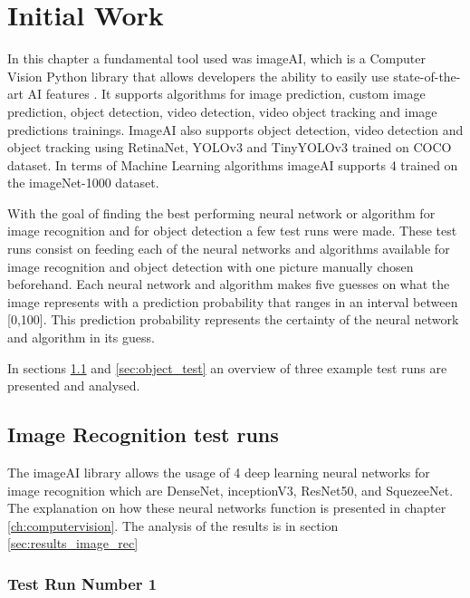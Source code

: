 \cleardoublepage

\chapter{Initial Work}

\par In this chapter a fundamental tool used was imageAI, which is a Computer Vision Python library that allows developers the ability to easily use state-of-the-art AI features . It supports algorithms for image prediction, custom image prediction, object detection, video detection, video object tracking and image predictions trainings. ImageAI also supports object detection, video detection and object tracking using RetinaNet, YOLOv3 and TinyYOLOv3 trained on COCO dataset. In terms of Machine Learning algorithms imageAI supports 4 trained on the imageNet-1000 dataset. \cite{ImageAI}


\par With the goal of finding the best performing neural network or algorithm for image recognition and for object detection a few test runs were made. These test runs consist on feeding each of the neural networks and algorithms available for image recognition and object detection with one picture manually chosen beforehand. Each neural network and algorithm makes five guesses on what the image represents with a prediction probability that ranges in an interval between [0,100]. This prediction probability represents the certainty of the neural network and algorithm in its guess.
\par In sections \ref{sec:image_test} and \ref{sec:object_test} an overview of three example test runs are presented and analysed.



\section{Image Recognition test runs}
\label{sec:image_test}

\par The imageAI library allows the usage of 4 deep learning neural networks for image recognition which are DenseNet, inceptionV3, ResNet50, and SquezeeNet. The explanation on how these neural networks function is presented in chapter \ref{ch:computervision}. The analysis of the results is in section  \ref{sec:results_image_rec}



    \newpage
    \subsection{Test Run Number 1}


